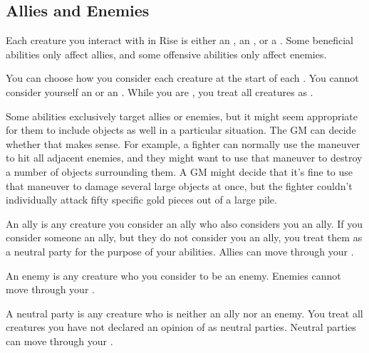     \subsection{Allies and Enemies}\label{Allies and Enemies}
        Each creature you interact with in Rise is either an , an , or a .
        Some beneficial abilities only affect allies, and some offensive abilities only affect enemies.

        You can choose how you consider each creature at the start of each .
        You cannot consider yourself an  or an .
        While you are \unconscious, you treat all creatures as .

        Some abilities exclusively target allies or enemies, but it might seem appropriate for them to include objects as well in a particular situation.
        The GM can decide whether that makes sense.
        For example, a fighter can normally use the  maneuver to hit all adjacent enemies, and they might want to use that maneuver to destroy a number of objects surrounding them.
        A GM might decide that it's fine to use that maneuver to damage several large objects at once, but the fighter couldn't individually attack fifty specific gold pieces out of a large pile.

         An ally is any creature you consider an ally who also considers you an ally.
        If you consider someone an ally, but they do not consider you an ally, you treat them as a neutral party for the purpose of your abilities.
        Allies can move through your .

         An enemy is any creature who you consider to be an enemy.
        Enemies cannot move through your .

         A neutral party is any creature who is neither an ally nor an enemy.
        You treat all creatures you have not declared an opinion of as neutral parties.
        Neutral parties can move through your .
